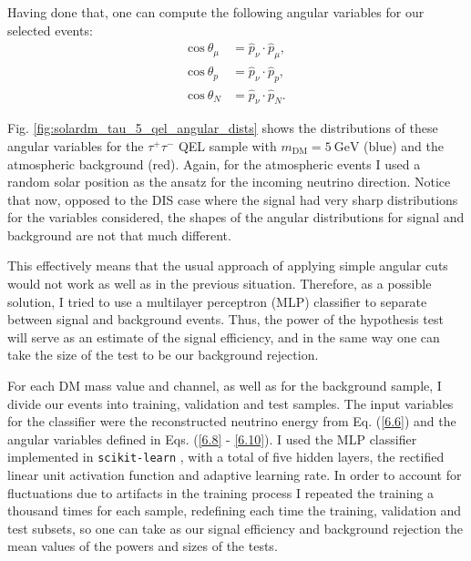 Having done that, one can compute the following angular variables for our selected events:
\begin{align}
	\mathrm{cos} \ \theta_{\mu} &= \hat{p}_{\nu} \cdot \hat{p}_{\mu},\label{6.8} \\
	\mathrm{cos} \ \theta_{p} &= \hat{p}_{\nu} \cdot \hat{p}_{p},\label{6.9} \\
	\mathrm{cos} \ \theta_{N} &= \hat{p}_{\nu} \cdot \hat{p}_{N}. \label{6.10}
\end{align}

Fig. \ref{fig:solardm_tau_5_qel_angular_dists} shows the distributions of these angular variables for the $\tau^{+}\tau^{-}$ QEL sample with $m_{\mathrm{DM}} = 5 \ \mathrm{GeV}$ (blue) and the atmospheric background (red). Again, for the atmospheric events I used a random solar position as the ansatz for the incoming neutrino direction. Notice that now, opposed to the DIS case where the signal had very sharp distributions for the variables considered, the shapes of the angular distributions for signal and background are not that much different.

This effectively means that the usual approach of applying simple angular cuts would not work as well as in the previous situation. Therefore, as a possible solution, I tried to use a multilayer perceptron (MLP) classifier to separate between signal and background events. Thus, the power of the hypothesis test will serve as an estimate of the signal efficiency, and in the same way one can take the size of the test to be our background rejection.

For each DM mass value and channel, as well as for the background sample, I divide our events into training, validation and test samples. The input variables for the classifier were the reconstructed neutrino energy from Eq. (\ref{6.6}) and the angular variables defined in Eqs. (\ref{6.8} - \ref{6.10}). I used the MLP classifier implemented in \texttt{scikit-learn} \cite{scikit-learn}, with a total of five hidden layers, the rectified linear unit activation function and adaptive learning rate. In order to account for fluctuations due to artifacts in the training process I repeated the training a thousand times for each sample, redefining each time the training, validation and test subsets, so one can take as our signal efficiency and background rejection the mean values of the powers and sizes of the tests.

